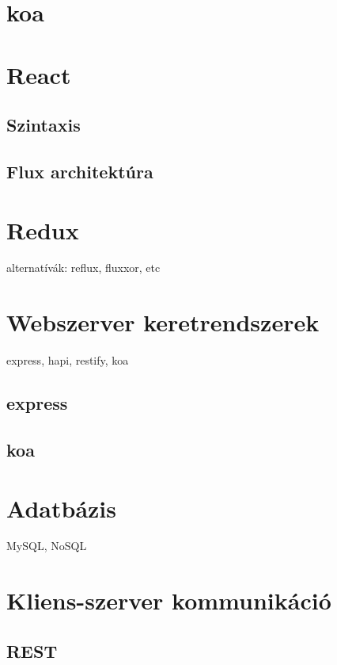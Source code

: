 \section{koa}

\section{React}

\subsection{Szintaxis}

\subsection{Flux architektúra}

\section{Redux}

alternatívák: reflux, fluxxor, etc

\section{Webszerver keretrendszerek}

express, hapi, restify, koa

\subsection{express}

\subsection{koa}

\section{Adatbázis}

MySQL, NoSQL

\section{Kliens-szerver kommunikáció}

\subsection{REST}

